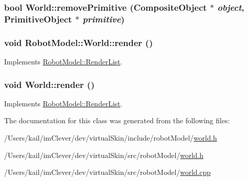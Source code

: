\label{class_robot_model_1_1_world_a9bcebd1811fdc24fcc02ca64f37bcfaf}
\hypertarget{class_robot_model_1_1_world_a498c5d79bc95bd308680c2a8c5e475b0}{
\subsubsection[{removePrimitive}]{\setlength{\rightskip}{0pt plus 5cm}bool World::removePrimitive ({\bf CompositeObject} $\ast$ {\em object}, \/  {\bf PrimitiveObject} $\ast$ {\em primitive})}}
\label{class_robot_model_1_1_world_a498c5d79bc95bd308680c2a8c5e475b0}
\hypertarget{class_robot_model_1_1_world_a3a197c0bac0b3dbbdd73942a56168a29}{
\subsubsection[{render}]{\setlength{\rightskip}{0pt plus 5cm}void RobotModel::World::render ()}}
\label{class_robot_model_1_1_world_a3a197c0bac0b3dbbdd73942a56168a29}


Implements \hyperlink{class_robot_model_1_1_render_list_ac8646765beee22bf11582049dc3cf195}{RobotModel::RenderList}.\hypertarget{class_robot_model_1_1_world_a150eab10c21532162bb698d72aecec16}{
\subsubsection[{render}]{\setlength{\rightskip}{0pt plus 5cm}void World::render ()}}
\label{class_robot_model_1_1_world_a150eab10c21532162bb698d72aecec16}


Implements \hyperlink{class_robot_model_1_1_render_list_ac8646765beee22bf11582049dc3cf195}{RobotModel::RenderList}.

The documentation for this class was generated from the following files:\begin{DoxyCompactItemize}
\item 
/Users/kail/imClever/dev/virtualSkin/include/robotModel/\hyperlink{include_2robot_model_2world_8h}{world.h}\item 
/Users/kail/imClever/dev/virtualSkin/src/robotModel/\hyperlink{src_2robot_model_2world_8h}{world.h}\item 
/Users/kail/imClever/dev/virtualSkin/src/robotModel/\hyperlink{world_8cpp}{world.cpp}\end{DoxyCompactItemize}
